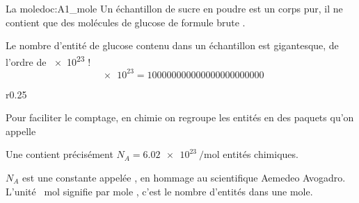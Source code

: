 

\begin{doc}{La mole}{doc:A1_mole}
  Un échantillon de sucre en poudre est un corps pur, il ne contient que des molécules de glucose de formule brute .

  Le nombre d'entité de glucose contenu dans un échantillon est gigantesque, de l'ordre de \num{e23} !
  \begin{equation*}
    \num{e23} = \num{100 000 000 000 000 000 000 000}
  \end{equation*}

  \begin{wrapfigure}{r}{0.25\linewidth}
    \centering \vspace*{-50pt}
     \\[4pt]
  \end{wrapfigure}
  Pour faciliter le comptage, en chimie on regroupe les entités en des paquets qu'on appelle 
  \begin{importants}
    Une  contient précisément $N_A = \qty{6,02 e23}{\per\mole}$ entités chimiques.
  \end{importants}
  \attention $N_A$ est une constante appelée , en hommage au scientifique Aemedeo Avogadro.
  L'unité \og \unit{\per\mole} \fg\! signifie \og par mole \fg, c’est le nombre d'entités dans une mole.
\end{doc}

